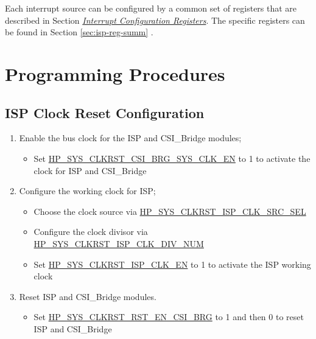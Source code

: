 \documentclass[main\_\_EN.tex]{subfiles}
\begin{document}
Each interrupt source can be configured by a common set of registers that are described in Section \hyperref[interrupt-config-registers]{\textit{Interrupt Configuration Registers}}. The specific registers can be found in Section \ref{sec:isp-reg-summ} \textit{}.



\section{Programming Procedures}
\label{sec:isp-prog-procedures}


\subsection{ISP Clock Reset Configuration}
\label{sec:isp_clkrst_proc}
\begin{enumerate}
    \item Enable the bus clock for the ISP and CSI\_Bridge modules;
    \begin{itemize}
        \item Set \hyperref[fielddesc:HPSYSCLKRSTCSIBRGSYSCLKEN]{HP\_SYS\_CLKRST\_CSI\_BRG\_SYS\_CLK\_EN} to 1 to activate the clock for ISP and CSI\_Bridge
    \end{itemize}
    \item Configure the working clock for ISP;
    \begin{itemize}
        \item Choose the clock source via \hyperref[fielddesc:HPSYSCLKRSTISPCLKSRCSEL]{HP\_SYS\_CLKRST\_ISP\_CLK\_SRC\_SEL}
        \item Configure the clock divisor via \hyperref[fielddesc:HPSYSCLKRSTISPCLKDIVNUM]{HP\_SYS\_CLKRST\_ISP\_CLK\_DIV\_NUM}
        \item Set \hyperref[fielddesc:HPSYSCLKRSTISPCLKEN]{HP\_SYS\_CLKRST\_ISP\_CLK\_EN} to 1 to activate the ISP working clock
    \end{itemize}
    \item Reset ISP and CSI\_Bridge modules.
    \begin{itemize}
        \item Set \hyperref[fielddesc:HPSYSCLKRSTRSTENCSIBRG]{HP\_SYS\_CLKRST\_RST\_EN\_CSI\_BRG} to 1 and then 0 to reset ISP and CSI\_Bridge
    \end{itemize}
\end{enumerate}
\end{document}
